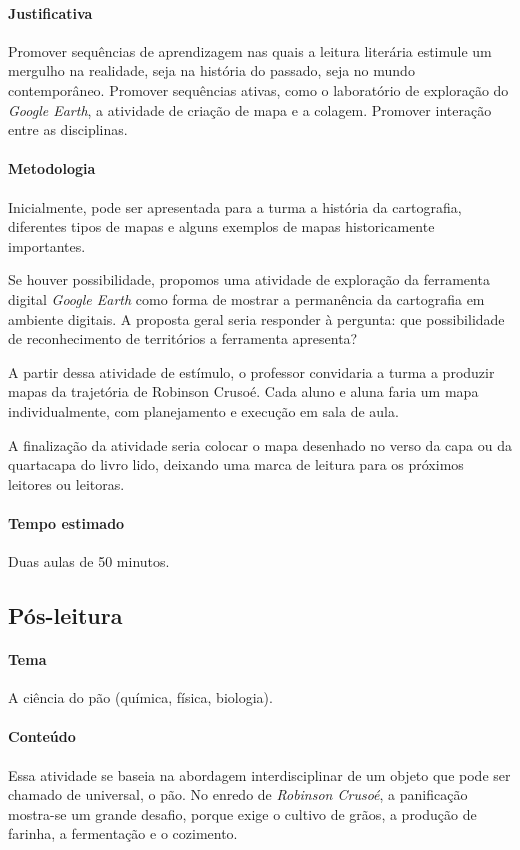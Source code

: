 \documentclass[12pt]{extarticle}
\begin{document}
\paragraph{Justificativa}
Promover sequências de aprendizagem nas quais a leitura literária
estimule um mergulho na realidade, seja na história do passado, seja no
mundo contemporâneo. Promover sequências ativas, como o laboratório de
exploração do \emph{Google Earth}, a atividade de criação de mapa e a colagem.
Promover interação entre as disciplinas.

\paragraph{Metodologia}
Inicialmente, pode ser apresentada para a turma a história da cartografia,
diferentes tipos de mapas e alguns exemplos de mapas historicamente
importantes.

Se houver possibilidade, propomos uma atividade de exploração da
ferramenta digital \emph{Google Earth} como forma de mostrar a permanência da
cartografia em ambiente digitais. A proposta geral seria responder à
pergunta: que possibilidade de reconhecimento de territórios a
ferramenta apresenta?

A partir dessa atividade de estímulo, o professor convidaria a turma a
produzir mapas da trajetória de Robinson Crusoé. Cada aluno e aluna
faria um mapa individualmente, com planejamento e execução em sala de
aula.

A finalização da atividade seria colocar o mapa desenhado no verso da capa
ou da quartacapa do livro lido, deixando uma marca de leitura para os
próximos leitores ou leitoras.

\paragraph{Tempo estimado} Duas aulas de 50 minutos.

\subsection{Pós-leitura}

\paragraph{Tema} A ciência do pão (química, física, biologia).


\paragraph{Conteúdo}
Essa atividade se baseia na abordagem interdisciplinar de um objeto que
pode ser chamado de universal, o pão. No enredo de \emph{Robinson Crusoé}, a panificação mostra-se um grande
desafio, porque exige o cultivo de grãos, a produção de farinha, a
fermentação e o cozimento.
\end{document}
